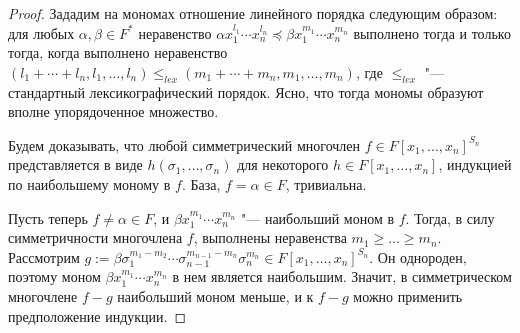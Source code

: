 \begin{proof}
	Зададим на мономах отношение линейного порядка следующим образом: для любых $\alpha, \beta \in F^*$ неравенство $\alpha x_1^{l_1}\dotsm x_n^{l_n} \preccurlyeq \beta x_1^{m_1}\dotsm x_n^{m_n}$ выполнено тогда и только тогда, когда выполнено неравенство $(l_1 + \dotsb + l_n, l_1, 
	\dotsc, l_n) \le_{lex} (m_1 + \dotsb + m_n, m_1, 
	\dotsc, m_n)$, где $\le_{lex}$ "--- стандартный лексикографический порядок. Ясно, что тогда мономы образуют вполне упорядоченное множество.
	
	Будем доказывать, что любой симметрический многочлен $f \in F[x_1, \dotsc, x_n]^{S_n}$ представляется в виде $h(\sigma_1, \dotsc, \sigma_n)$ для некоторого $h \in F[x_1, \dotsc, x_n]$, индукцией по наибольшему моному в $f$. База, $f = \alpha \in F$, тривиальна.
	
	Пусть теперь $f \ne \alpha \in F$, и $\beta x_1^{m_1}\dotsm x_n^{m_n}$ "--- наибольший моном в $f$. Тогда, в силу симметричности многочлена $f$, выполнены неравенства $m_1 \ge \dotsc \ge m_n$. Рассмотрим $g := \beta\sigma_1^{m_1 - m_2}\dotsm\sigma_{n - 1}^{m_{n - 1} - m_n}\sigma_n^{m_n} \in F[x_1, \dotsc, x_n]^{S_n}$. Он однороден, поэтому моном $\beta x_1^{m_1}\dotsm x_n^{m_n}$ в нем является наибольшим. Значит, в симметрическом многочлене $f - g$ наибольший моном меньше, и к $f - g$ можно применить предположение индукции.
\end{proof}


